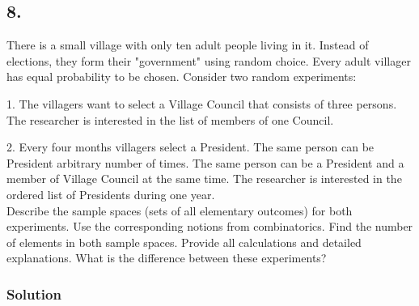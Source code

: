 \documentclass[a4paper]{article}
\begin{document}
\subsection*{8.} There is a small village with only ten adult people living in it. Instead of elections, they form their "government" using random choice. Every adult villager has equal probability to be chosen. Consider two random experiments: \\

\par 1. The villagers want to select a Village Council that consists of three persons. The researcher is interested in the list of members of one Council.

\par 2. Every four months villagers select a President. The same person can be President arbitrary number of times. The same person can be a President and a member of Village Council at the same time. The researcher is interested in the ordered list of Presidents during one year. \\

Describe the sample spaces (sets of all elementary outcomes) for both experiments. Use the corresponding notions from combinatorics. Find the number of elements in both sample spaces. Provide all calculations and detailed explanations. What is the difference between these experiments?

\subsubsection*{Solution}
\end{document}

